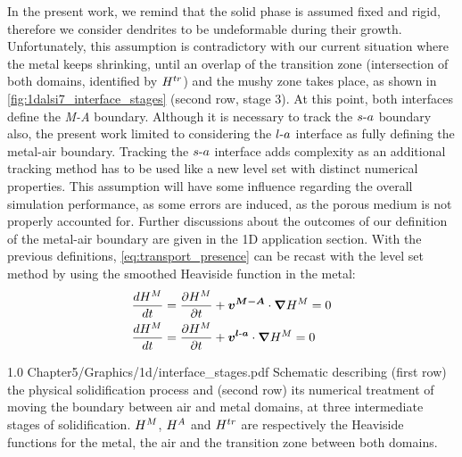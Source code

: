 In the present work, we remind that the solid phase is assumed fixed and rigid, therefore we consider dendrites to be undeformable during their growth. 
Unfortunately, this assumption is contradictory with our current situation where the metal keeps shrinking, 
until an overlap of the transition zone (intersection of both domains, identified by $H^{tr}$) and the mushy zone takes place, 
as shown in \cref{fig:1dalsi7_interface_stages} (second row, stage 3).
At this point, both interfaces define the \emph{M-A} boundary. Although it is necessary to track the $s\text{-}a$ boundary also, the present work limited to considering the $l\text{-}a$ interface as fully defining the metal-air boundary. 
Tracking the $s\text{-}a$ interface adds complexity as an additional tracking method has to be used like a new level set with distinct numerical properties. 
This assumption will have some influence regarding the overall simulation performance, as some errors are induced, as the porous medium is not properly accounted for.
Further discussions about the outcomes of our definition of the metal-air boundary are given in the 1D application section.
With the previous definitions, \cref{eq:transport_presence} can be recast with the level set 
method by using the smoothed Heaviside function in the metal:
\begin{subequations}
\begin{align}
\label{eq:transport_heaviside}
& \frac{d H^M}{dt} = \frac{\partial H^M}{\partial t}  + \boldsymbol{v^{M-A}} \cdot \boldsymbol{\nabla} H^M = 0 \\
& \frac{d H^M}{dt} = \frac{\partial H^M}{\partial t}  + \boldsymbol{v^{l\text{-}a}} \cdot \boldsymbol{\nabla} H^M = 0
\end{align}
\end{subequations}

\begin{figureth}
{1.0}
{Chapter5/Graphics/1d/interface_stages.pdf}
{Schematic describing (first row) the physical solidification process and (second row) its numerical treatment of moving the boundary between air and metal domains, at three intermediate stages of solidification. 
$H^M$, $H^A$ and $H^{tr}$ are respectively the Heaviside functions for the metal, the air and the transition zone between both domains.}
\label{fig:1dalsi7_interface_stages}
\end{figureth}

